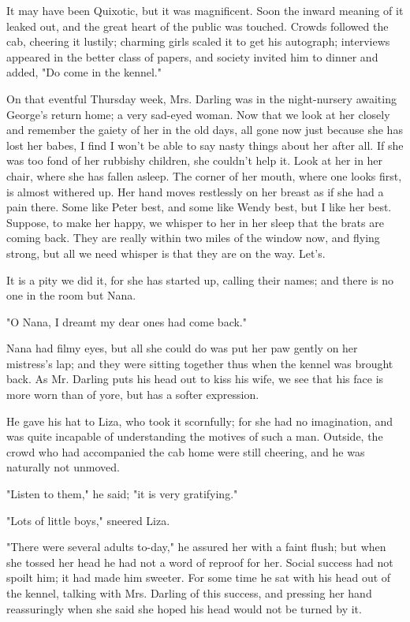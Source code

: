 It may have been Quixotic, but it was magnificent. Soon the inward meaning
of it leaked out, and the great heart of the public was touched. Crowds
followed the cab, cheering it lustily; charming girls scaled it to get his
autograph; interviews appeared in the better class of papers, and society
invited him to dinner and added, "Do come in the kennel."


On that eventful Thursday week, Mrs. Darling was in the night-nursery
awaiting George's return home; a very sad-eyed woman. Now that we look at
her closely and remember the gaiety of her in the old days, all gone now
just because she has lost her babes, I find I won't be able to say nasty
things about her after all. If she was too fond of her rubbishy children,
she couldn't help it. Look at her in her chair, where she has fallen
asleep. The corner of her mouth, where one looks first, is almost withered
up. Her hand moves restlessly on her breast as if she had a pain there.
Some like Peter best, and some like Wendy best, but I like her best.
Suppose, to make her happy, we whisper to her in her sleep that the brats
are coming back. They are really within two miles of the window now, and
flying strong, but all we need whisper is that they are on the way. Let's.


It is a pity we did it, for she has started up, calling their names; and
there is no one in the room but Nana.


"O Nana, I dreamt my dear ones had come back."


Nana had filmy eyes, but all she could do was put her paw gently on her
mistress's lap; and they were sitting together thus when the kennel was
brought back. As Mr. Darling puts his head out to kiss his wife, we see
that his face is more worn than of yore, but has a softer expression.


He gave his hat to Liza, who took it scornfully; for she had no
imagination, and was quite incapable of understanding the motives of such
a man. Outside, the crowd who had accompanied the cab home were still
cheering, and he was naturally not unmoved.


"Listen to them," he said; "it is very gratifying."


"Lots of little boys," sneered Liza.


"There were several adults to-day," he assured her with a faint flush; but
when she tossed her head he had not a word of reproof for her. Social
success had not spoilt him; it had made him sweeter. For some time he sat
with his head out of the kennel, talking with Mrs. Darling of this
success, and pressing her hand reassuringly when she said she hoped his
head would not be turned by it.


